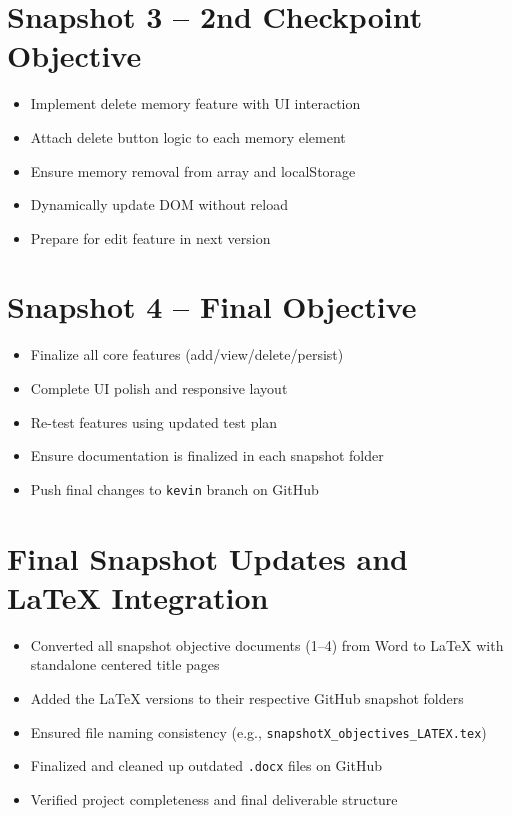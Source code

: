 \documentclass[12pt]{article}
\begin{document}
\section{Snapshot 3 – 2nd Checkpoint Objective}
\begin{itemize}
  \item Implement delete memory feature with UI interaction
  \item Attach delete button logic to each memory element
  \item Ensure memory removal from array and localStorage
  \item Dynamically update DOM without reload
  \item Prepare for edit feature in next version
\end{itemize}

\section{Snapshot 4 – Final Objective}
\begin{itemize}
  \item Finalize all core features (add/view/delete/persist)
  \item Complete UI polish and responsive layout
  \item Re-test features using updated test plan
  \item Ensure documentation is finalized in each snapshot folder
  \item Push final changes to \texttt{kevin} branch on GitHub
\end{itemize}

\section{Final Snapshot Updates and LaTeX Integration}
\begin{itemize}
  \item Converted all snapshot objective documents (1--4) from Word to LaTeX with standalone centered title pages
  \item Added the LaTeX versions to their respective GitHub snapshot folders
  \item Ensured file naming consistency (e.g., \texttt{snapshotX\_objectives\_LATEX.tex})
  \item Finalized and cleaned up outdated \texttt{.docx} files on GitHub
  \item Verified project completeness and final deliverable structure
\end{itemize}
\end{document}

